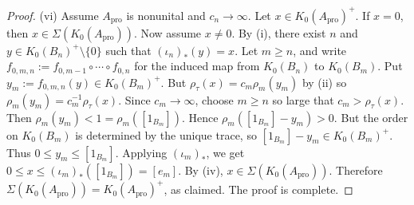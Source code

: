 \documentclass[10pt,a4paper]{amsart}
\newcommand{\ex}{\mathrm{pro}}
\begin{document}
\begin{proof}
\smallskip

\noindent
\textup{(vi)}
Assume $A_{\ex}$ is nonunital and $c_n\to\infty$. Let
$x\in K_0(A_{\ex})^+.$
If $x=0$, then $x\in\Sigma(K_0(A_{\ex}))$.
Now assume $x\neq0$. By \textup{(i)}, there exist $n$ and $y\in K_0(B_n)^+\setminus\{0\}$ such
that $(\iota_n)_*(y)=x.$
Let $m\geq n$, and write
$f_{0,m,n}:=f_{0,m-1}\circ\cdots\circ f_{0,n}$
for the induced map from \(K_0(B_n)\) to \(K_0(B_m)\). Put
$y_m:=f_{0,m,n}(y)\in K_0(B_m)^+.$ But 
$\rho_\tau(x)=c_m\rho_m(y_m)$ by \textup{(ii)}
so $\rho_m(y_m)=c_m^{-1}\rho_\tau(x).$
Since $c_m\to\infty$, choose $m\geq n$ so large that
$c_m>\rho_\tau(x).$
Then $\rho_m(y_m)<1=\rho_m([1_{B_m}]).$
Hence $\rho_m([1_{B_m}]-y_m)>0.$ But
the order on \(K_0(B_m)\) is determined by the unique trace, so
$[1_{B_m}]-y_m\in K_0(B_m)^+.$
Thus $0\leq y_m\leq [1_{B_m}].$
Applying $(\iota_m)_*$, we get
$0\leq x\leq (\iota_m)_*([1_{B_m}])=[e_m].$
By \textup{(iv)}, $x\in\Sigma(K_0(A_{\ex})).$
Therefore $\Sigma(K_0(A_{\ex}))=K_0(A_{\ex})^+$, as claimed. The proof is complete.
\end{proof}
\end{document}
